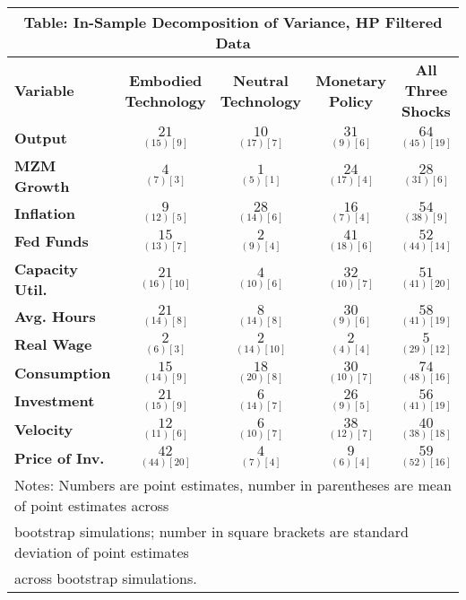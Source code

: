 \documentclass{article}
\begin{document}
 \begin{tabular}{|l|c|@{}c|c|@{}c|} 
 \hline 
 \multicolumn{5}{|c|}{\textbf{Table: In-Sample Decomposition of Variance, HP Filtered Data}} \\ \hline 
 \textbf{Variable} & \textbf{Embodied Technology} & \textbf{Neutral Technology} & \textbf{%
 Monetary Policy} & \textbf{All Three Shocks} \\ \hline\hline 
 \textbf{Output} & $\underset{( 15)[  9]}{ 21}$ & $\underset{( 17)[  7]}{ 10}$ & $\underset{(  9)[  6]}{ 31}$ & $\underset{( 45)[ 19]}{ 64}$ \\ \hline 
 \textbf{MZM Growth} & $\underset{(  7)[  3]}{  4}$ & $\underset{(  5)[  1]}{  1}$ & $\underset{( 17)[  4]}{ 24}$ & $\underset{( 31)[  6]}{ 28}$ \\ \hline 
 \textbf{Inflation} & $\underset{( 12)[  5]}{  9}$ & $\underset{( 14)[  6]}{ 28}$ & $\underset{(  7)[  4]}{ 16}$ & $\underset{( 38)[  9]}{ 54}$ \\ \hline 
 \textbf{Fed Funds} & $\underset{( 13)[  7]}{ 15}$ & $\underset{(  9)[  4]}{  2}$ & $\underset{( 18)[  6]}{ 41}$ & $\underset{( 44)[ 14]}{ 52}$ \\ \hline 
 \textbf{Capacity Util.} & $\underset{( 16)[ 10]}{ 21}$ & $\underset{( 10)[  6]}{  4}$ & $\underset{( 10)[  7]}{ 32}$ & $\underset{( 41)[ 20]}{ 51}$ \\ \hline 
 \textbf{Avg. Hours} & $\underset{( 14)[  8]}{ 21}$ & $\underset{( 14)[  8]}{  8}$ & $\underset{(  9)[  6]}{ 30}$ & $\underset{( 41)[ 19]}{ 58}$ \\ \hline 
 \textbf{Real Wage} & $\underset{(  6)[  3]}{  2}$ & $\underset{( 14)[ 10]}{  2}$ & $\underset{(  4)[  4]}{  2}$ & $\underset{( 29)[ 12]}{  5}$ \\ \hline 
 \textbf{Consumption} & $\underset{( 14)[  9]}{ 15}$ & $\underset{( 20)[  8]}{ 18}$ & $\underset{( 10)[  7]}{ 30}$ & $\underset{( 48)[ 16]}{ 74}$ \\ \hline 
 \textbf{Investment} & $\underset{( 15)[  9]}{ 21}$ & $\underset{( 14)[  7]}{  6}$ & $\underset{(  9)[  5]}{ 26}$ & $\underset{( 41)[ 19]}{ 56}$ \\ \hline 
 \textbf{Velocity} & $\underset{( 11)[  6]}{ 12}$ & $\underset{( 10)[  7]}{  6}$ & $\underset{( 12)[  7]}{ 38}$ & $\underset{( 38)[ 18]}{ 40}$ \\ \hline 
 \textbf{Price of Inv.} & $\underset{( 44)[ 20]}{ 42}$ & $\underset{(  7)[  4]}{  4}  $ & $\underset{(  6)[  4]}{  9}$ & $\underset{( 52)[ 16]}{ 59}$ \\ \hline 
 \multicolumn{5}{|l|}{Notes: Numbers are point estimates, number in 
 parentheses are mean of point estimates across} \\ \hline 
 \multicolumn{5}{|l|}{bootstrap simulations; number in square brackets are 
 standard deviation of point estimates} \\ \hline 
 \multicolumn{5}{|l|}{across bootstrap simulations.} \\ \hline 
 \end{tabular} 
\end{document}
